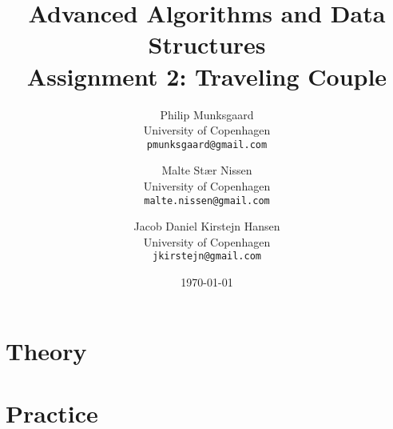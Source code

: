 \documentclass[11pt,a4paper,english]{article}
\title{Advanced Algorithms and Data Structures\\
       Assignment 2: Traveling Couple}
\author{
  Philip Munksgaard\\
    University of Copenhagen\\
    \texttt{pmunksgaard@gmail.com}
    \and
        Malte Stær Nissen\\
    University of Copenhagen\\
          \texttt{malte.nissen@gmail.com}
    \and
  Jacob Daniel Kirstejn Hansen\\
    University of Copenhagen\\
    \texttt{jkirstejn@gmail.com}
}
\date{\today}
\begin{document}
\maketitle

\tableofcontents
\clearpage




\section{Theory}



\section{Practice}


%
\end{document}
